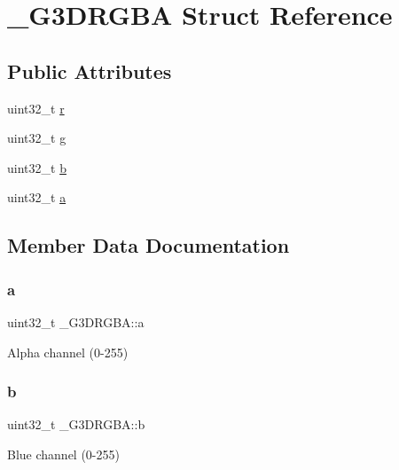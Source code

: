 \hypertarget{struct__G3DRGBA}{}\section{\+\_\+\+G3\+D\+R\+G\+BA Struct Reference}
\label{struct__G3DRGBA}
\subsection*{Public Attributes}
\begin{DoxyCompactItemize}
\item 
uint32\+\_\+t \hyperlink{struct__G3DRGBA_a0ed2188e1394cd4d06d6898b5c266d02}{r}
\item 
uint32\+\_\+t \hyperlink{struct__G3DRGBA_a67c418883e19709c121f3fe6d6c9c996}{g}
\item 
uint32\+\_\+t \hyperlink{struct__G3DRGBA_a2d5445c71c1db663ca05fe4af523c754}{b}
\item 
uint32\+\_\+t \hyperlink{struct__G3DRGBA_a3daeffab74ba147e7f10f75cc5d82f1d}{a}
\end{DoxyCompactItemize}


\subsection{Member Data Documentation}
\mbox{\label{struct__G3DRGBA_a3daeffab74ba147e7f10f75cc5d82f1d}} 
\subsubsection{\texorpdfstring{a}{a}}
{\footnotesize\ttfamily uint32\+\_\+t \+\_\+\+G3\+D\+R\+G\+B\+A\+::a}

Alpha channel (0-\/255) \mbox{\label{struct__G3DRGBA_a2d5445c71c1db663ca05fe4af523c754}} 
\subsubsection{\texorpdfstring{b}{b}}
{\footnotesize\ttfamily uint32\+\_\+t \+\_\+\+G3\+D\+R\+G\+B\+A\+::b}

Blue channel (0-\/255) \mbox{\label{struct__G3DRGBA_a67c418883e19709c121f3fe6d6c9c996}} 
